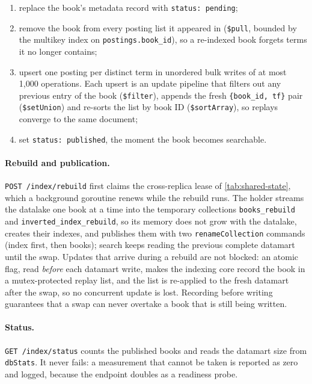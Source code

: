 \documentclass[10pt,a4paper]{article}
\newcommand{\code}[1]{\texttt{#1}}
\newcommand{\route}[1]{\texttt{#1}}
\begin{document}
\begin{enumerate}
  \item replace the book's metadata record with \code{status: pending};
  \item remove the book from every posting list it appeared in
  (\code{\$pull}, bounded by the multikey index on \code{postings.book\_id}),
  so a re-indexed book forgets terms it no longer contains;
  \item upsert one posting per distinct term in unordered bulk writes of at
  most 1{,}000 operations. Each upsert is an update pipeline that filters out
  any previous entry of the book (\code{\$filter}), appends the fresh
  \code{\{book\_id, tf\}} pair (\code{\$setUnion}) and re-sorts the list by
  book ID (\code{\$sortArray}), so replays converge to the same document;
  \item set \code{status: published}, the moment the book becomes searchable.
\end{enumerate}

\paragraph{Rebuild and publication.}
\route{POST /index/rebuild} first claims the cross-replica lease of
\cref{tab:shared-state}, which a background goroutine renews while the rebuild
runs. The holder streams the datalake one book at a time into the temporary
collections \code{books\_rebuild} and \code{inverted\_index\_rebuild}, so its
memory does not grow with the datalake, creates their indexes, and publishes
them with two \code{renameCollection} commands (index first, then books);
search keeps reading the previous complete datamart until the swap. Updates that
arrive during a rebuild are not blocked: an atomic flag, read \emph{before}
each datamart write, makes the indexing core record the book in a
mutex-protected replay list, and the list is re-applied to the fresh datamart after the swap,
so no concurrent update is lost. Recording before writing guarantees that a
swap can never overtake a book that is still being written.

\paragraph{Status.}
\route{GET /index/status} counts the published books and reads the datamart
size from \code{dbStats}. It never fails: a measurement that cannot be taken
is reported as zero and logged, because the endpoint doubles as a readiness
probe.
\end{document}
